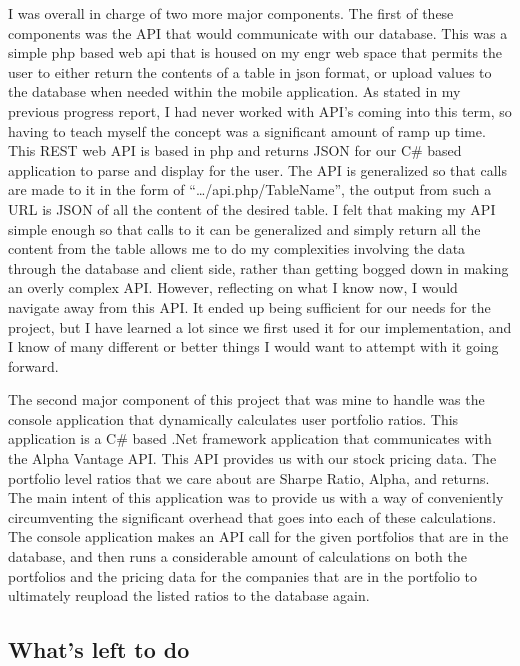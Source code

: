 \documentclass[letterpaper,10pt,titlepage,journal,compsoc,draftclsnofoot,onecolumn]{IEEEtran}
\begin{document}
I was overall in charge of two more major components. The first of these components was the API that would communicate with our database. This was a simple php based web api that is housed on my engr web space that permits the user to either return the contents of a table in json format, or upload values to the database when needed within the mobile application. As stated in my previous progress report, I had never worked with API's coming into this term, so having to teach myself the concept was a significant amount of ramp up time. This REST web API is based in php and returns JSON for our C\# based application to parse and display for the user.  The API is generalized so that calls are made to it in the form of “…/api.php/{TableName}”, the output from such a URL is JSON of all the content of the desired table. I felt that making my API simple enough so that calls to it can be generalized and simply return all the content from the table allows me to do my complexities involving the data  through the database and client side, rather than getting bogged down in making an overly complex API. However, reflecting on what I know now, I would navigate away from this API. It ended up being sufficient for our needs for the project, but I have learned a lot since we first used it for our implementation, and I know of many different or better things I would want to attempt with it going forward.

The second major component of this project that was mine to handle was the console application that dynamically calculates user portfolio ratios. This application is a C\# based .Net framework application that communicates with the Alpha Vantage API. This API provides us with our stock pricing data. The portfolio level ratios that we care about are Sharpe Ratio, Alpha, and returns. The main intent of this application was to provide us with a way of conveniently circumventing the significant overhead that goes into each of these calculations. The console application makes an API call for the given portfolios that are in the database, and then runs a considerable amount of calculations on both the portfolios and the pricing data for the companies that are in the portfolio to ultimately reupload the listed ratios to the database again. 

\subsection{What's left to do}
\end{document}
